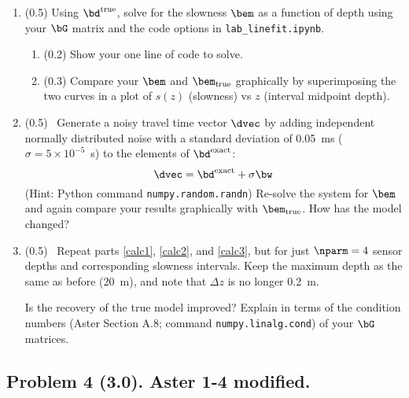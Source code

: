 \documentclass[11pt,titlepage,fleqn]{article}
\begin{document}
\begin{enumerate}
\label{calc1}


\item (0.5) Using $\bd^{\rm true}$, solve for the slowness $\bem$ as a function of depth using your $\bG$ matrix and the code options in \verb+lab_linefit.ipynb+.
%
\begin{enumerate}
\item (0.2) Show your one line of code to solve.
\item (0.3) Compare your $\bem$ and $\bem_{\rm true}$ graphically by superimposing the two curves in a plot of $s(z)$ (slowness) vs $z$ (interval midpoint depth).
\end{enumerate}

\label{calc2}


\item (0.5) \ptag\ Generate a noisy travel time vector $\dvec$ by adding independent normally distributed noise with a standard deviation of 0.05~ms ($\sigma = 5 \times 10^{-5}$~s) to the elements of $\bd^{\rm exact}$:
%
\begin{equation}
\dvec = \bd^{\rm exact} + \sigma\bw
\end{equation}
%
(Hint: Python command \verb+numpy.random.randn+) Re-solve the system for $\bem$ and again compare your results graphically with $\bem_{\rm true}$. How has the model changed?

\label{calc3}


\item (0.5) \ptag\ Repeat parts \ref{calc1}, \ref{calc2}, and \ref{calc3}, but for just $\nparm=4$ sensor depths and corresponding slowness intervals. Keep the maximum depth as the same as before (20~m), and note that $\Delta z$ is no longer 0.2~m.

Is the recovery of the true model improved? Explain in terms of the condition numbers (Aster Section A.8; command \verb+numpy.linalg.cond+) of your $\bG$ matrices.

\end{enumerate}


\subsection*{Problem 4 (3.0). Aster 1-4 modified.}
\end{document}
